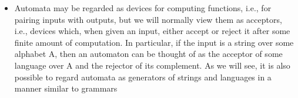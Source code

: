 \documentclass{beamer}
\begin{document}
	\begin{frame}
		\begin{itemize}
			\item Automata may be regarded as devices for computing functions, i.e., for pairing inputs with outputs, but we will normally view them as acceptors, i.e., devices which, when given an input, either accept or reject it after some finite amount of computation. In particular, if the input is a string over some alphabet A, then an automaton can be thought of as the acceptor of some language over A and the rejector of its complement. As we will see, it is also possible to regard automata as generators of strings and languages in a manner similar to grammars
		\end{itemize}
	\end{frame}
\end{document}
